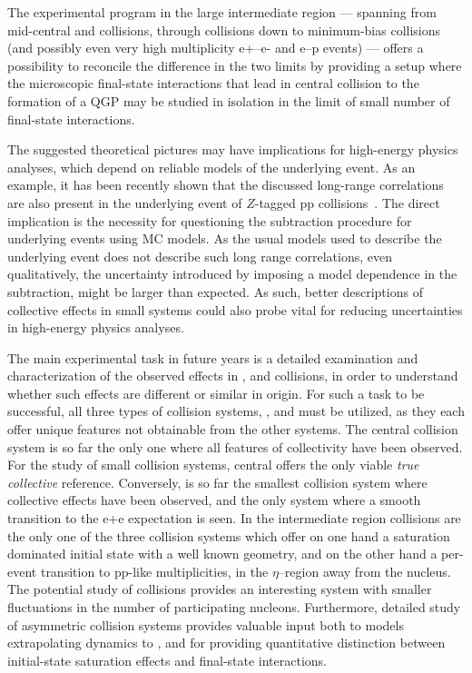 \documentclass[../report.tex]{subfiles}
\begin{document}
The experimental program in the large intermediate region --- spanning from mid-central \PbPb and \XeXe collisions, through \pPb collisions down to minimum-bias \pp collisions (and possibly even very high multiplicity e+--e- and e--p events)  --- offers a possibility to reconcile the difference in the two limits by providing a setup where the microscopic final-state interactions that lead in central \PbPb collision to the formation of a QGP may be studied in isolation in the limit of small number of final-state interactions.

The suggested theoretical pictures may have implications for high-energy physics analyses, which depend on reliable models of the underlying event. As an example, it has been recently shown that the discussed long-range correlations are also present in the underlying event of $Z$-tagged pp collisions~\cite{ATLAS:2017nkt}. The direct implication is the necessity for questioning the subtraction procedure for underlying events using MC models. As the usual models used to describe the underlying event does not describe such long range correlations, even qualitatively, the uncertainty introduced by imposing a model dependence in the subtraction, might be larger than expected. As such, better descriptions of collective effects in small systems could also probe vital for reducing uncertainties in high-energy physics analyses.

The main experimental task in future years is a detailed examination and characterization of the observed effects in \pp, \pPb and \PbPb collisions, in order to understand whether such effects are different or similar in origin. For such a task to be successful, all three types of collision systems, \pp, \pPb and \PbPb must be utilized, as they each offer unique features not obtainable from the other systems. The central \PbPb collision system is so far the only one where all features of collectivity have been observed. For the study of small collision systems, central \PbPb offers the only viable \emph{true collective} reference. Conversely, \pp is so far the smallest collision system where collective effects have been observed, and the only system where a smooth transition to the e+e expectation is seen. In the intermediate region \pPb collisions are the only one of the three collision systems which offer on one hand a saturation dominated initial state with a well known geometry, and on the other hand a per-event  transition to pp-like multiplicities, in the $\eta$--region away from the nucleus. The potential study of \pO collisions provides an interesting system with smaller fluctuations in the number of participating nucleons.
Furthermore, detailed study of asymmetric collision systems provides valuable input both to models extrapolating \pp dynamics to \PbPb, and for providing quantitative distinction between initial-state saturation effects and final-state interactions.
\end{document}

